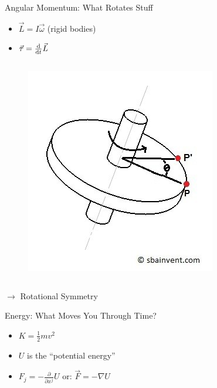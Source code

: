 \documentclass[10pt,xcolor={table,dvipsnames},t]{beamer}
\begin{document}
\begin{frame}{Angular Momentum: What Rotates Stuff}
    \begin{itemize}
        \item $\vec{L} = I \vec{\omega}$ (rigid bodies)
        \item $\vec{\tau} = \dv{t}\vec{L}$
    \end{itemize}
    \begin{columns}[c]
        \begin{figure}
            \includegraphics[scale=0.25]{fixed_axis_rot.jpg}
        \end{figure}
    \end{columns}
    \vspace{5pt}
    $\to$ Rotational Symmetry
\end{frame}

\begin{frame}{Energy: What Moves You Through Time?}
    \begin{itemize}
        \item $K = \frac{1}{2}mv^2$
        \item $U$ is the ``potential energy''
        \item $F_j = - \frac{\partial}{\partial x^{\hspace{1pt}j}} U$ or: $\Vec{F} = - \nabla U$
    \end{itemize}
\end{frame}
\end{document}
